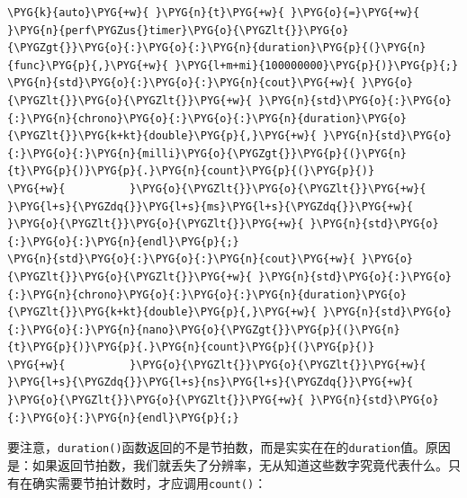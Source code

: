 \begin{codeblockbg}
\begin{Verbatim}[commandchars=\\\{\},breaklines=true,breakanywhere=true,fontsize=\codefont,xleftmargin=17bp]
\PYG{k}{auto}\PYG{+w}{ }\PYG{n}{t}\PYG{+w}{ }\PYG{o}{=}\PYG{+w}{ }\PYG{n}{perf\PYGZus{}timer}\PYG{o}{\PYGZlt{}}\PYG{o}{\PYGZgt{}}\PYG{o}{:}\PYG{o}{:}\PYG{n}{duration}\PYG{p}{(}\PYG{n}{func}\PYG{p}{,}\PYG{+w}{ }\PYG{l+m+mi}{100000000}\PYG{p}{)}\PYG{p}{;}
\PYG{n}{std}\PYG{o}{:}\PYG{o}{:}\PYG{n}{cout}\PYG{+w}{ }\PYG{o}{\PYGZlt{}}\PYG{o}{\PYGZlt{}}\PYG{+w}{ }\PYG{n}{std}\PYG{o}{:}\PYG{o}{:}\PYG{n}{chrono}\PYG{o}{:}\PYG{o}{:}\PYG{n}{duration}\PYG{o}{\PYGZlt{}}\PYG{k+kt}{double}\PYG{p}{,}\PYG{+w}{ }\PYG{n}{std}\PYG{o}{:}\PYG{o}{:}\PYG{n}{milli}\PYG{o}{\PYGZgt{}}\PYG{p}{(}\PYG{n}{t}\PYG{p}{)}\PYG{p}{.}\PYG{n}{count}\PYG{p}{(}\PYG{p}{)}
\PYG{+w}{          }\PYG{o}{\PYGZlt{}}\PYG{o}{\PYGZlt{}}\PYG{+w}{ }\PYG{l+s}{\PYGZdq{}}\PYG{l+s}{ms}\PYG{l+s}{\PYGZdq{}}\PYG{+w}{ }\PYG{o}{\PYGZlt{}}\PYG{o}{\PYGZlt{}}\PYG{+w}{ }\PYG{n}{std}\PYG{o}{:}\PYG{o}{:}\PYG{n}{endl}\PYG{p}{;}
\PYG{n}{std}\PYG{o}{:}\PYG{o}{:}\PYG{n}{cout}\PYG{+w}{ }\PYG{o}{\PYGZlt{}}\PYG{o}{\PYGZlt{}}\PYG{+w}{ }\PYG{n}{std}\PYG{o}{:}\PYG{o}{:}\PYG{n}{chrono}\PYG{o}{:}\PYG{o}{:}\PYG{n}{duration}\PYG{o}{\PYGZlt{}}\PYG{k+kt}{double}\PYG{p}{,}\PYG{+w}{ }\PYG{n}{std}\PYG{o}{:}\PYG{o}{:}\PYG{n}{nano}\PYG{o}{\PYGZgt{}}\PYG{p}{(}\PYG{n}{t}\PYG{p}{)}\PYG{p}{.}\PYG{n}{count}\PYG{p}{(}\PYG{p}{)}
\PYG{+w}{          }\PYG{o}{\PYGZlt{}}\PYG{o}{\PYGZlt{}}\PYG{+w}{ }\PYG{l+s}{\PYGZdq{}}\PYG{l+s}{ns}\PYG{l+s}{\PYGZdq{}}\PYG{+w}{ }\PYG{o}{\PYGZlt{}}\PYG{o}{\PYGZlt{}}\PYG{+w}{ }\PYG{n}{std}\PYG{o}{:}\PYG{o}{:}\PYG{n}{endl}\PYG{p}{;}
\end{Verbatim}
\end{codeblockbg}



要注意，\texttt{duration()}函数返回的不是节拍数，而是实实在在的\texttt{duration}值。原因是：如果返回节拍数，我们就丢失了分辨率，无从知道这些数字究竟代表什么。只有在确实需要节拍计数时，才应调用\texttt{count()}：



